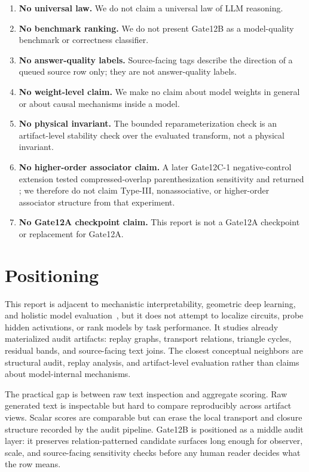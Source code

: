 \documentclass[11pt]{article}
\newcommand{\code}[1]{\texttt{\detokenize{#1}}}
\begin{document}
\begin{enumerate}
    \item \textbf{No universal law.} We do not claim a universal law of LLM
    reasoning.
    \item \textbf{No benchmark ranking.} We do not present Gate12B as a
    model-quality benchmark or correctness classifier.
    \item \textbf{No answer-quality labels.} Source-facing tags describe the
    direction of a queued source row only; they are not answer-quality labels.
    \item \textbf{No weight-level claim.} We make no claim about model weights
    in general or about causal mechanisms inside a model.
    \item \textbf{No physical invariant.} The bounded reparameterization check
    is an artifact-level stability check over the evaluated transform, not a
    physical invariant.
    \item \textbf{No higher-order associator claim.} A later Gate12C-1
    negative-control extension tested compressed-overlap parenthesization
    sensitivity and returned \code{no_directional_support}; we therefore do not
    claim Type-III, nonassociative, or higher-order associator structure from
    that experiment.
    \item \textbf{No Gate12A checkpoint claim.} This report is not a Gate12A
    checkpoint or replacement for Gate12A.
\end{enumerate}

\section{Positioning}
\label{sec:positioning}

This report is adjacent to mechanistic interpretability, geometric deep
learning, and holistic model
evaluation~\cite{olsson2022induction,conmy2023automated,bronstein2021geometric,liang2022helm,lin2022truthfulqa},
but it does not attempt to localize circuits, probe hidden activations, or rank
models by task performance. It studies already materialized audit artifacts:
replay graphs, transport relations, triangle cycles, residual bands, and
source-facing text joins. The closest conceptual neighbors are structural
audit, replay analysis, and artifact-level evaluation rather than claims about
model-internal mechanisms.

The practical gap is between raw text inspection and aggregate scoring. Raw
generated text is inspectable but hard to compare reproducibly across artifact
views. Scalar scores are comparable but can erase the local transport and
closure structure recorded by the audit pipeline. Gate12B is positioned as a
middle audit layer: it preserves relation-patterned candidate surfaces long
enough for observer, scale, and source-facing sensitivity checks before any
human reader decides what the row means.
\end{document}
